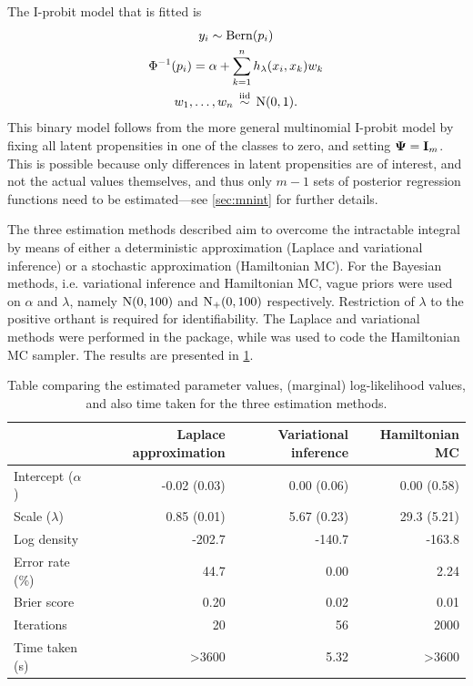 The I-probit model that is fitted is
\begin{gather*}
  y_i \sim \operatorname{Bern}(p_i) \\
  \Phi^{-1}(p_i) = \alpha + \sum_{k=1}^n h_\lambda(x_i,x_k)w_k  \\
  w_1,\dots,w_n \,\overset{\text{iid}}{\sim}\, \operatorname{N}(0,1).
\end{gather*}
This binary model follows from the more general multinomial I-probit model by fixing all latent propensities in one of the classes to zero, and setting ${\bm\Psi} = {\mathbf I}_m$.
This is possible because only differences in latent propensities are of interest, and not the actual values themselves, and thus only $m-1$ sets of posterior regression functions need to be estimated---see \cref{sec:mnint} for further details.

The three estimation methods described aim to overcome the intractable integral by means of either a deterministic approximation (Laplace and variational inference) or a stochastic approximation (Hamiltonian MC).
For the Bayesian methods, i.e. variational inference and Hamiltonian MC, vague priors were used on $\alpha$ and $\lambda$, namely $\operatorname{N}(0,100)$ and $\operatorname{N}_+(0,100)$ respectively.
Restriction of $\lambda$ to the positive orthant is required for identifiability.
The Laplace and variational methods were performed in the  package, while  was used to code the Hamiltonian MC sampler.
The results are presented in \cref{tab:compreiprobit}.

\begin{table}[hbt]
\centering
\caption{Table comparing the estimated parameter values, (marginal) log-likelihood values, and also time taken for the three estimation methods.}
\label{tab:compreiprobit}
\begin{tabular}{@{}lrrr@{}}
\toprule
& Laplace approximation 
& Variational inference 
& Hamiltonian MC          \\ \midrule
Intercept ($\alpha$)      & -0.02 (0.03)           & 0.00 (0.06)    & 0.00 (0.58)  \\
Scale ($\lambda$)      & 0.85 (0.01)         & 5.67 (0.23)  & 29.3 (5.21)     \\[0.5em]
Log density    & -202.7              & -140.7       & -163.8                  \\
Error rate (\%) & 44.7               & 0.00        & 2.24                   \\
Brier score & 0.20               & 0.02        & 0.01                   \\[0.5em]
Iterations     & 20                  & 56          & 2000                    \\
Time taken (s) & >3600                & 5.32         & >3600                     \\ \bottomrule
\end{tabular}
\end{table}

